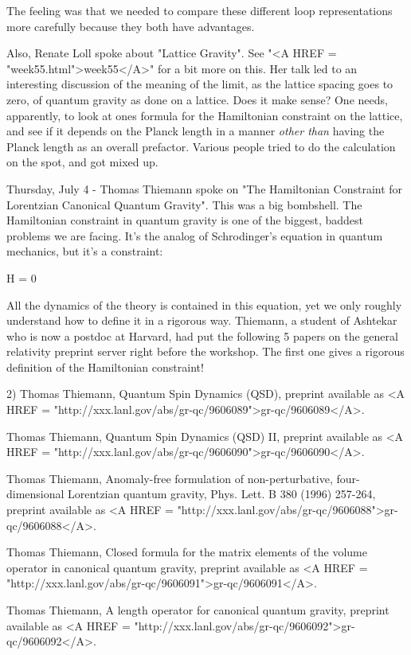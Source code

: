 The feeling was that we needed to compare these different loop
representations more carefully because they both have advantages.

Also, Renate Loll spoke about "Lattice Gravity".  See "<A HREF = "week55.html">week55</A>" for a
bit more on this.  Her talk led to an interesting discussion of the
meaning of the limit, as the lattice spacing goes to zero, of quantum
gravity as done on a lattice.  Does it make sense?  One needs,
apparently, to look at ones formula for the Hamiltonian constraint on
the lattice, and see if it depends on the Planck length in a manner
\emph{other than} having the Planck length as an overall prefactor.
Various people tried to do the calculation on the spot, and got mixed
up.

Thursday, July 4 - Thomas Thiemann spoke on "The Hamiltonian
Constraint for Lorentzian Canonical Quantum Gravity".  This was a big
bombshell.  The Hamiltonian constraint in quantum gravity is one of
the biggest, baddest problems we are facing.  It's the analog of
Schrodinger's equation in quantum mechanics, but it's a constraint:

                      H \Psi  = 0

All the dynamics of the theory is contained in this equation, yet we
only roughly understand how to define it in a rigorous way.  Thiemann,
a student of Ashtekar who is now a postdoc at Harvard, had put the
following 5 papers on the general relativity preprint server right
before the workshop.  The first one gives a rigorous definition of the
Hamiltonian constraint!

2) Thomas Thiemann, Quantum Spin Dynamics (QSD), preprint available
as <A HREF = "http://xxx.lanl.gov/abs/gr-qc/9606089">gr-qc/9606089</A>.  

Thomas Thiemann, Quantum Spin Dynamics (QSD) II, preprint available
as <A HREF = "http://xxx.lanl.gov/abs/gr-qc/9606090">gr-qc/9606090</A>.

Thomas Thiemann, Anomaly-free formulation of non-perturbative,
four-dimensional Lorentzian quantum gravity, 
Phys. Lett. B 380 (1996) 257-264,
preprint available as <A HREF = 
"http://xxx.lanl.gov/abs/gr-qc/9606088">gr-qc/9606088</A>.

Thomas Thiemann, Closed formula for the matrix elements of the volume
operator in canonical quantum gravity, preprint available as
<A HREF = "http://xxx.lanl.gov/abs/gr-qc/9606091">gr-qc/9606091</A>.

Thomas Thiemann, A length operator for canonical quantum gravity,
preprint available as <A HREF = "http://xxx.lanl.gov/abs/gr-qc/9606092">gr-qc/9606092</A>.

